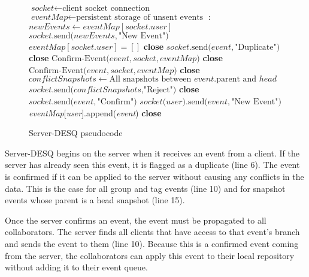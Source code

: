 \begin{center}
\begin{figure}[h]
\begin{algorithmic}[1]
\State $\textit{socket} \gets \text{client socket connection}$
\State $\textit{eventMap} \gets \text{persistent storage of unsent events}$
:
\State $newEvents \gets eventMap[socket.user]$
\State $socket\text{.send(}newEvents, \text{"New Event")}$
\State $eventMap[socket.user] = []$
\EndIf
\State \textbf{close}
\EndIf
{}
\State $socket\text{.send(}event, \text{"Duplicate")}$
\State \textbf{close}
\EndIf
{}
\State $\text{Confirm-Event(}event, socket, eventMap\text{)}$
\State \textbf{close}
\Else
{}
\State $\text{Confirm-Event(}event, socket, eventMap\text{)}$
\State \textbf{close}
\Else
\State $conflictSnapshots \gets \text{All snapshots between }event\text{.parent and }head$
\State $socket\text{.send(}conflictSnapshots\text{,"Reject")}$
\State \textbf{close}
\EndIf
\EndIf
\EndOn
\EndProcedure
{}
\State $socket\text{.send(}event, \text{"Confirm")}$
\State $socket\text{(}user\text{).send(}event, \text{"New Event")}$
\Else
\State \emph{eventMap}[\emph{user}].append(\emph{event})
\EndIf
\EndFor
\State \textbf{close}
\EndProcedure
\end{algorithmic}
\caption{Server-DESQ pseudocode}\label{euclid}
\end{figure}
\end{center}

Server-DESQ begins on the server when it receives an event from a client. If the server has already seen this event, it is flagged as a duplicate (line 6). The event is confirmed if it can be applied to the server without causing any conflicts in the data. This is the case for all group and tag events (line 10) and for snapshot events whose parent is a head snapshot (line 15).

Once the server confirms an event, the event must be propagated to all collaborators. The server finds all clients that have access to that event's branch and sends the event to them (line 10). Because this is a confirmed event coming from the server, the collaborators can apply this event to their local repository without adding it to their event queue.

